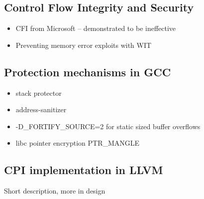 \subsection {Control Flow Integrity and Security}
\begin {itemize}
    \item CFI from Microsoft -- demonstrated to be ineffective
    \item Preventing memory error exploits with WIT
\end {itemize}

\subsection {Protection mechanisms in GCC}
\begin {itemize}
    \item stack protector
    \item address-sanitizer
    \item -D\_FORTIFY\_SOURCE=2 for static sized buffer overflows
    \item libc pointer encryption PTR\_MANGLE
\end {itemize}

\subsection {CPI implementation in LLVM}
Short description, more in design

